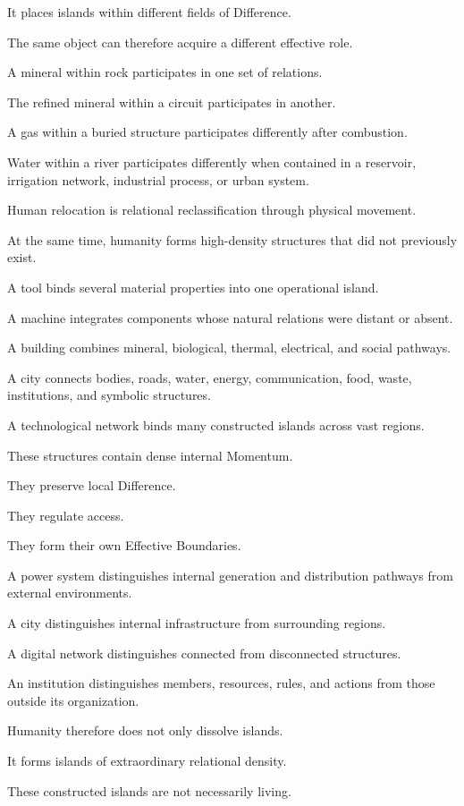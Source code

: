 It places islands within different fields of Difference.

The same object can therefore acquire a different effective role.

A mineral within rock participates in one set of relations.

The refined mineral within a circuit participates in another.

A gas within a buried structure participates differently after combustion.

Water within a river participates differently when contained in a reservoir, irrigation network, industrial process, or urban system.

Human relocation is relational reclassification through physical movement.

At the same time, humanity forms high-density structures that did not previously exist.

A tool binds several material properties into one operational island.

A machine integrates components whose natural relations were distant or absent.

A building combines mineral, biological, thermal, electrical, and social pathways.

A city connects bodies, roads, water, energy, communication, food, waste, institutions, and symbolic structures.

A technological network binds many constructed islands across vast regions.

These structures contain dense internal Momentum.

They preserve local Difference.

They regulate access.

They form their own Effective Boundaries.

A power system distinguishes internal generation and distribution pathways from external environments.

A city distinguishes internal infrastructure from surrounding regions.

A digital network distinguishes connected from disconnected structures.

An institution distinguishes members, resources, rules, and actions from those outside its organization.

Humanity therefore does not only dissolve islands.

It forms islands of extraordinary relational density.

These constructed islands are not necessarily living.

